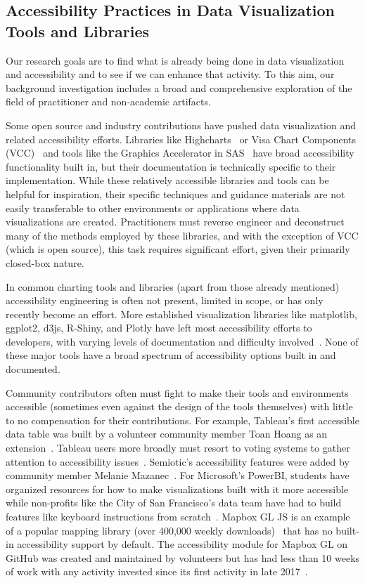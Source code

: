 \documentclass[12pt]{cmuthesis}
\begin{document}
\subsection{Accessibility Practices in Data Visualization Tools and Libraries}
Our research goals are to find what is already being done in data visualization and accessibility and to see if we can enhance that activity. To this aim, our background investigation includes a broad and comprehensive exploration of the field of practitioner and non-academic artifacts.

Some open source and industry contributions have pushed data visualization and related accessibility efforts. Libraries like Highcharts~\cite{Highsoft} or Visa Chart Components (VCC)~\cite{VisaVisa} and tools like the Graphics Accelerator in SAS~\cite{SASSAS} have broad accessibility functionality built in, but their documentation is technically specific to their implementation. While these relatively accessible libraries and tools can be helpful for inspiration, their specific techniques and guidance materials are not easily transferable to other environments or applications where data visualizations are created. Practitioners must reverse engineer and deconstruct many of the methods employed by these libraries, and with the exception of VCC (which is open source), this task requires significant effort, given their primarily closed-box nature. 

In common charting tools and libraries (apart from those already mentioned) accessibility engineering is often not present, limited in scope, or has only recently become an effort. More established visualization libraries like matplotlib, ggplot2, d3js, R-Shiny, and Plotly have left most accessibility efforts to developers, with varying levels of documentation and difficulty involved~\cite{Forum2018Are, Community2018Making, CanelonRevealing, Forum2019Datatables, Wheatcroft2020Making}. None of these major tools have a broad spectrum of accessibility options built in and documented.

Community contributors often must fight to make their tools and environments accessible (sometimes even against the design of the tools themselves) with little to no compensation for their contributions. For example, Tableau’s first accessible data table was built by a volunteer community member Toan Hoang as an extension~\cite{Hoang2018TableauMagic}. Tableau users more broadly must resort to voting systems to gather attention to accessibility issues~\cite{DeMartiniTableau}. Semiotic’s accessibility features were added by community member Melanie Mazanec~\cite{MazanecSemiotic}. For Microsoft’s PowerBI, students have organized resources for how to make visualizations built with it more accessible~\cite{KleinPower} while non-profits like the City of San Francisco’s data team have had to build features like keyboard instructions from scratch~\cite{SanCOVID}. Mapbox GL JS is an example of a popular mapping library (over 400,000 weekly downloads)~\cite{MapboxMapbox} that has no built-in accessibility support by default. The accessibility module for Mapbox GL on GitHub was created and maintained by volunteers but has had less than 10 weeks of work with any activity invested since its first activity in late 2017~\cite{Mapbox2021Mapbox}. 
\end{document}
